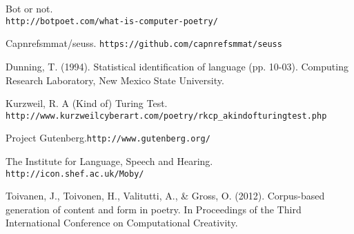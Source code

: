 \documentclass[10pt,twocolumn]{article}
\begin{document}
\begin{thebibliography}{10}

 Bot or not. \\
 \begin{adjustbox}{width=\linewidth}\verb+http://botpoet.com/what-is-computer-poetry/+\end{adjustbox}

 Capnrefsmmat/seuss. \begin{adjustbox}{max width=\linewidth}\verb+https://github.com/capnrefsmmat/seuss+\end{adjustbox}

 Dunning, T. (1994). Statistical identification of language (pp. 10-03). Computing Research Laboratory, New Mexico State University.

 Kurzweil, R. A (Kind of) Turing Test. \begin{adjustbox}{width=\linewidth}\verb+http://www.kurzweilcyberart.com/poetry/rkcp_akindofturingtest.php+\end{adjustbox}

 Project Gutenberg.\verb+http://www.gutenberg.org/+

 The Institute for Language, Speech and Hearing. \verb+http://icon.shef.ac.uk/Moby/+

 Toivanen, J., Toivonen, H., Valitutti, A., \& Gross, O. (2012). Corpus-based generation of content and form in poetry. In Proceedings of the Third International Conference on Computational Creativity.

\end{thebibliography} 
\pagebreak
\clearpage
\end{document}
